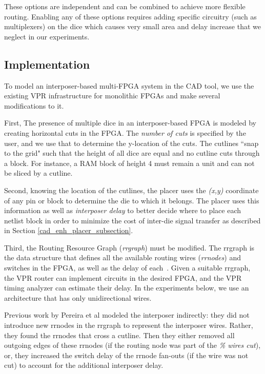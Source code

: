 \documentclass{sig-alternate-2013}
\begin{document}
These options are independent and can be combined to achieve more flexible routing. Enabling any of these options requires adding specific circuitry (such as multiplexers) on the dice which causes very small area and delay increase that we neglect in our experiments.

\subsection{Implementation}
To model an interposer-based multi-FPGA system in the CAD tool, we use the existing VPR infrastructure for monolithic FPGAs and make several modifications to it.

First, The presence of multiple dice in an interposer-based FPGA is modeled by creating horizontal cuts in the FPGA. The \textit{number of cuts} is specified by the user, and we use that to determine the y-location of the cuts. The cutlines ``snap to the grid" such that the height of all dice are equal and no cutline cuts through a block. For instance, a RAM block of height 4 must remain a unit and can not be sliced by a cutline.

Second, knowing the location of the cutlines, the placer uses the \textit{(x,y)} coordinate of any pin or block to determine the die to which it belongs. The placer uses this information as well as \textit{interposer delay} to better decide where to place each netlist block in order to minimize the cost of inter-die signal transfer as described in Section \ref{cad_enh_placer_subsection}.

Third, the Routing Resource Graph (\textit{rrgraph}) must be modified. The rrgraph is the data structure that defines all the available routing wires (\textit{rrnodes}) and switches in the FPGA, as well as the delay of each~\cite{betz1999architecture}. Given a suitable rrgraph, the VPR router can implement circuits in the desired FPGA, and the VPR timing analyzer can estimate their delay. In the experiments below, we use an architecture that has only unidirectional wires.

Previous work by Pereira et al \cite{hahn2014cad} modeled the interposer indirectly: they did not introduce new rrnodes in the rrgraph to represent the interposer wires. Rather, they found the rrnodes that cross a cutline. Then they either removed all outgoing edges of these rrnodes (if the routing node was part of the \textit{\% wires cut}), or, they increased the switch delay of the rrnode fan-outs (if the wire was not cut) to account for the additional interposer delay.
\end{document}
